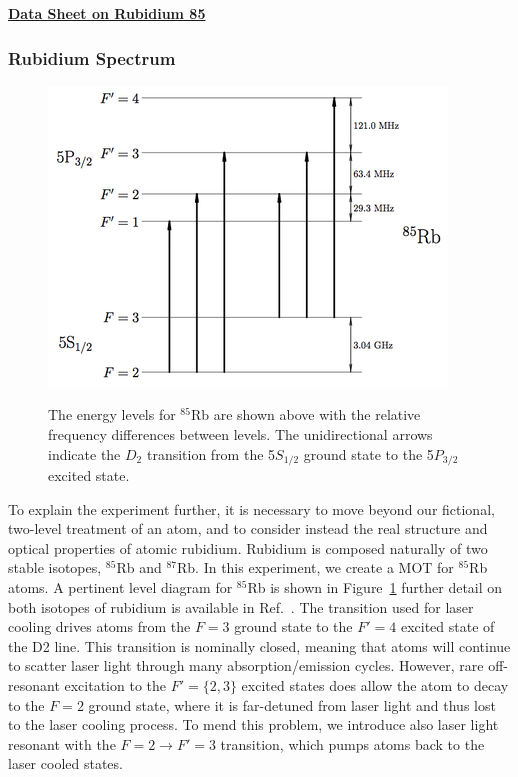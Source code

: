\documentclass{../lab}
\begin{document}
\href{http://physics111.lib.berkeley.edu/Physics111/Reprints/MOT/rubidium85numbers.pdf}{\textbf{\textbf{Data Sheet on Rubidium 85}}}

\subsubsection{Rubidium Spectrum}
\label{subsubsec:RubidiumSpectrum}

\begin{figure}[h]
    \centering
    \href{http://experimentationlab.berkeley.edu/sites/default/files/images/400px-MOTimage005.png}{\includegraphics[width=0.6\linewidth]{images/400px-MOTimage005.png}}
    \caption{The energy levels for $^{85}$Rb are shown above with the relative frequency differences between levels. The unidirectional arrows indicate the $D_2$ transition from the 5$S_{1/2}$ ground state to the 5$P_{3/2}$ excited state.}
    \label{fig:400px-MOTimage005}
\end{figure}

To explain the experiment further, it is necessary to move beyond our fictional, two-level treatment of an atom, and to consider instead the real structure and optical properties of atomic rubidium. Rubidium is composed naturally of two stable isotopes, $^{85}$Rb and $^{87}$Rb. In this experiment, we create a MOT for $^{85}$Rb atoms. A pertinent level diagram for $^{85}$Rb is shown in Figure~\ref{fig:400px-MOTimage005} further detail on both isotopes of rubidium is available in Ref.~\cite{Steck}. The transition used for laser cooling drives atoms from the $F = 3$ ground state to the $F' = 4$ excited state of the D2 line. This transition is nominally closed, meaning that atoms will continue to scatter laser light through many absorption/emission cycles. However, rare off-resonant excitation to the $F' = \{2,3\}$ excited states does allow the atom to decay to the $F = 2$ ground state, where it is far-detuned from laser light and thus lost to the laser cooling process. To mend this problem, we introduce also laser light resonant with the $F = 2 \rightarrow F' = 3$ transition, which pumps atoms back to the laser cooled states.
\end{document}
